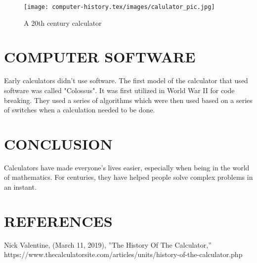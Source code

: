 \documentclass[letterpaper, 10 pt, conference]{IEEEconf}
\begin{document}
\begin{figure}[h!]
\centering
\texttt{[image: computer-history.tex/images/calulator\_pic.jpg]}
\caption{A 20th century calculator}
\label{fig:example}
\end{figure}


\section{COMPUTER SOFTWARE}

Early calculators didn't use software. The first model of the calculator that used software was called "Colossus". It was first utilized in World War II for code breaking. They used a series of algorithms which were then used based on a series of switches when a calculation needed to be done.
\section{CONCLUSION}

Calculators have made everyone's lives easier, especially when being in the world of mathematics. For centuries, they have helped people solve complex problems in an instant. 

\section*{REFERENCES}
\begin{enumerate}[label={[\arabic*]}]
\item Nick Valentine, (March 11, 2019),
''The History Of The Calculator,'' https://www.thecalculatorsite.com/articles/units/history-of-the-calculator.php 
\end{enumerate}
\end{document}
